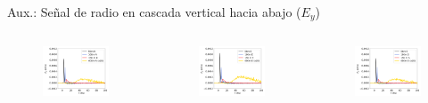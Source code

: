 \documentclass{beamer}
\begin{document}
\begin{frame}[noframenumbering]{Aux.: Señal de radio en cascada vertical hacia abajo ($E_y$)}
	\begin{columns}
		\begin{figure}[H]
			\centering
			\includegraphics[width=.8\linewidth]{figures/radio/p_1e17_0deg_EW_N_v2}
		\end{figure}
			\begin{figure}[H]
		\centering
		\includegraphics[width=.8\linewidth]{figures/radio/p_1e17_0deg_EW_E_v2}
	\end{figure}
			\begin{figure}[H]
		\centering
		\includegraphics[width=.8\linewidth]{figures/radio/p_1e17_0deg_EW_S_v2}

\end{figure}
\end{columns}
\end{frame}
\end{document}
